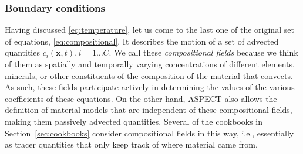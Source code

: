 \documentclass{article}
\newcommand{\aspect}{\textsc{ASPECT}}
\begin{document}
\subsubsection{Boundary conditions}
Having discussed \eqref{eq:temperature}, let us come to the last one of the
original set of equations, \eqref{eq:compositional}. It describes the
motion of a set of advected quantities $c_i(\mathbf x,t),i=1\ldots C$. We call these
\textit{compositional fields} because we think of them as spatially and
temporally varying concentrations of different elements, minerals, or other
constituents of the composition of the material that convects. As such, these
fields participate actively in determining the values of the various
coefficients of these equations. On the other hand, \aspect{} also allows the
definition of material models that are independent of these compositional
fields, making them passively advected quantities. Several of the cookbooks in
Section~\ref{sec:cookbooks} consider compositional fields in this way, i.e.,
essentially as tracer quantities that only keep track of where material came
from.
\end{document}
